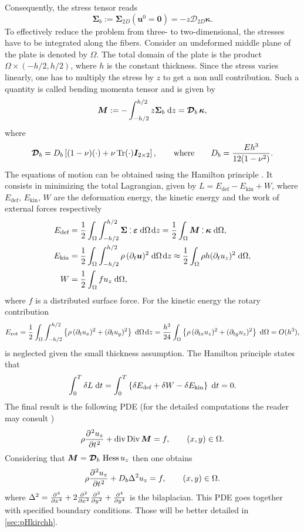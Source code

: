 Consequently, the stress tensor reads
\[
\bm{\Sigma}_b := \bm{\Sigma}_{2D}(\bm{u}^0=\bm{0}) = -z \bm{\mathcal{D}}_{2D} \bm{\kappa}.
\]
To effectively reduce the problem from three- to two-dimensional, the stresses have to be integrated along the fibers. Consider an undeformed middle plane of the plate is denoted by $\Omega$. The total domain of the plate is the product $\Omega \times (-h/2, h/2)$, where $h$ is the constant thickness. Since the stress varies linearly, one has to multiply the stress by $z$ to get a non null contribution. Such a quantity is called bending momenta tensor and is given by 
\begin{equation*}
\bm{M} :=-\int_{-h/2}^{h/2} z \bm{\Sigma}_{b} \d{z} = \bm{\mathcal{D}}_{b} \, \bm{\kappa}, 
\end{equation*}
where 
\[
\bm{\mathcal{D}}_{b} = D_b \left[ (1-\nu) (\cdot) + \nu \operatorname{Tr}(\cdot) \bm{I}_{2\times 2} \right], \qquad \text{where} \qquad D_b = \frac{E h^3}{12(1-\nu^2)}.
\]
The equations of motion can be obtained using the Hamilton principle \cite[Chapter 2]{reddy2006theory}. It consists in minimizing the total Lagrangian, given by $L = E_{\text{def}} - E_{\text{kin}} + W$, where $E_{\text{def}}, \, E_{\text{kin}}, \,W$ are the deformation energy, the kinetic energy and the work of external forces respectively
\begin{align*}
E_{\text{def}} &= \frac{1}{2} \int_{\Omega} \int_{-h/2}^{h/2} \bm{\Sigma} \cddot \bm{\varepsilon} \d{\Omega} \d{z} = \frac{1}{2} \int_{\Omega} \bm{M} \cddot \bm{\kappa} \d{\Omega}, \\
E_{\text{kin}} &= \frac{1}{2}  \int_{\Omega} \int_{-h/2}^{h/2} \rho \, (\partial_t \bm{u})^2 \d{\Omega} \d{z} \approx \frac{1}{2} \int_{\Omega} \rho h (\partial_t u_z)^2  \d{\Omega}, \\
W &= \frac{1}{2}  \int_{\Omega} f u_z \d{\Omega},
\end{align*}
where $f$ is a distributed surface force. For the kinetic energy the rotary contribution 
\[
E_{\text{rot}} =  \frac{1}{2}  \int_{\Omega} \int_{-h/2}^{h/2} \left\{\rho \, (\partial_t u_x)^2 + (\partial_t u_y)^2 \right\} \d{\Omega} \d{z} = \frac{h^3}{24} \int_{\Omega} \left\{\rho \, (\partial_{tx} u_z)^2 + (\partial_{ty} u_z)^2 \right\} \d{\Omega} = O(h^3),
\]
is neglected given the small thickness assumption. The Hamilton principle states that
\[
\int_{0}^{T} \delta L \d{t} = \int_{0}^{T} \left\{ \delta E_{\text{def}} + \delta W - \delta E_{\text{kin}} \right\} \d{t} = 0.
\]
The final result is the following PDE (for the detailed computations the reader may consult \cite[Chapter 2]{reddy2006theory})
\[
\rho \diffp[2]{u_z}{t} + \div\Div \bm{M} = f, \qquad (x,y) \in \Omega.
\]
Considering that $\bm{M}= \bm{\mathcal{D}}_b\, \operatorname*{Hess}{u_z}$ then one obtains
\begin{equation}\label{eq:classKir}
\rho \diffp[2]{u_z}{t} + D_b \Delta^2 u_z = f, \qquad (x,y) \in \Omega.
\end{equation}
where $\Delta^2 = \diffp[4]{}{x} + 2\diffp[2]{}{x}\diffp[2]{}{y} + \diffp[4]{}{y}$ is the bilaplacian. This PDE goes together with specified boundary conditions. Those will be better detailed in \ref{sec:pHkirchh}.
 
